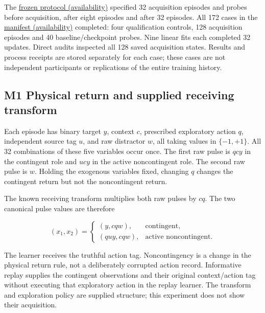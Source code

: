 \documentclass[
  american,
  11pt,
  letterpaper,
]{article}
\begin{document}
The \href{https://github.com/v5ma/v5ma.github.io/blob/master/papers/companions/learning-to-feel-v1.0/ARTIFACT-AVAILABILITY.md\#artifact-38}{frozen protocol (availability)} specified 32 acquisition episodes and probes before acquisition, after eight episodes and after 32 episodes. All 172 cases in the \href{https://github.com/v5ma/v5ma.github.io/blob/master/papers/companions/learning-to-feel-v1.0/ARTIFACT-AVAILABILITY.md\#artifact-37}{manifest (availability)} completed: four qualification controls, 128 acquisition episodes and 40 baseline/checkpoint probes. Nine linear fits each completed 32 updates. Direct audits inspected all 128 saved acquisition states. Results and process receipts are stored separately for each case; these cases are not independent participants or replications of the entire training history.

\subsection{M1 Physical return and supplied receiving transform}\label{m1-physical-return-and-supplied-receiving-transform}

Each episode has binary target \(y\), context \(c\), prescribed exploratory action \(q\), independent source tag \(u\), and raw distractor \(w\), all taking values in \(\{-1,+1\}\). All 32 combinations of these five variables occur once. The first raw pulse is \(qcy\) in the contingent role and \(ucy\) in the active noncontingent role. The second raw pulse is \(w\). Holding the exogenous variables fixed, changing \(q\) changes the contingent return but not the noncontingent return.

The known receiving transform multiplies both raw pulses by \(cq\). The two canonical pulse values are therefore

\begin{equation}
(x_1,x_2)=
\begin{cases}
(y,cqw), & \text{contingent},\\
(quy,cqw), & \text{active noncontingent}.
\end{cases}
\tag{M1}
\end{equation}

The learner receives the truthful action tag. Noncontingency is a change in the physical return rule, not a deliberately corrupted action record. Informative replay supplies the contingent observations and their original context/action tag without executing that exploratory action in the replay learner. The transform and exploration policy are supplied structure; this experiment does not show their acquisition.
\end{document}
